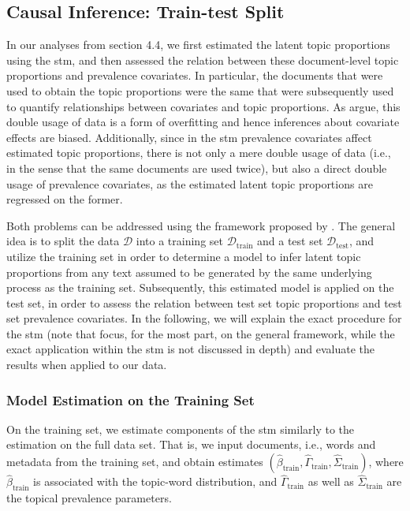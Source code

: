 \subsection{Causal Inference: Train-test Split}

In our analyses from section 4.4, we first estimated the latent topic proportions using the stm, and then assessed the relation between these document-level topic proportions and prevalence covariates. In particular, the documents that were used to obtain the topic proportions were the same that were subsequently used to quantify relationships between covariates and topic proportions. As \cite{egami2018make} argue, this double usage of data is a form of overfitting and hence inferences about covariate effects are biased. Additionally, since in the stm prevalence covariates affect estimated topic proportions, there is not only a mere double usage of data (i.e., in the sense that the same documents are used twice), but also a direct double usage of prevalence covariates, as the estimated latent topic proportions are regressed on the former.

Both problems can be addressed using the framework proposed by \cite{egami2018make}. The general idea is to split the data $\mathcal{D}$ into a training set $\mathcal{D}_{\text{train}}$ and a test set $\mathcal{D}_{\text{test}}$, and utilize the training set in order to determine a model to infer latent topic proportions from any text assumed to be generated by the same underlying process as the training set. Subsequently, this estimated model is applied on the test set, in order to assess the relation between test set topic proportions and test set prevalence covariates. In the following, we will explain the exact procedure for the stm (note that \cite{egami2018make} focus, for the most part, on the general framework, while the exact application within the stm is not discussed in depth) and evaluate the results when applied to our data. 

\subsubsection{Model Estimation on the Training Set}

On the training set, we estimate components of the stm similarly to the estimation on the full data set. That is, we input documents, i.e., words and metadata from the training set, and obtain estimates $(\hat{\beta}_{\text{train}}, \hat{\Gamma}_{\text{train}}, \hat{\Sigma}_{\text{train}})$, where $\hat{\beta}_{\text{train}}$ is associated with the topic-word distribution, and $\hat{\Gamma}_{\text{train}}$ as well as $\hat{\Sigma}_{\text{train}}$ are the topical prevalence parameters. 

